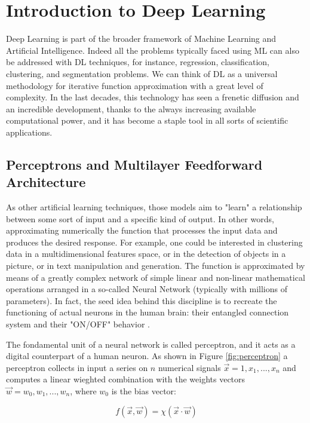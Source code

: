 \section{Introduction to Deep Learning}
Deep Learning is part of the broader framework of Machine Learning and Artificial Intelligence. Indeed all the problems typically faced using ML can also be addressed with DL techniques, for instance, regression, classification, clustering, and segmentation problems. We can think of DL as a universal methodology for iterative function approximation with a great level of complexity. In the last decades, this technology has seen a frenetic diffusion and an incredible development, thanks to the always increasing available computational power, and it has become a staple tool in all sorts of scientific applications.

\subsection{Perceptrons and Multilayer Feedforward Architecture}
As other artificial learning techniques, those models aim to "learn" a relationship between some sort of input and a specific kind of output. In other words,  approximating numerically the function that processes the input data and produces the desired response. For example, one could be interested in clustering data in a multidimensional features space, or in the detection of objects in a picture, or in text manipulation and generation. The function is approximated by means of a greatly complex network of simple linear and non-linear mathematical operations arranged in a so-called Neural Network (typically with millions of parameters). In fact, the seed idea behind this discipline is to recreate the functioning of actual neurons in the human brain: their entangled connection system and their "ON/OFF" behavior \cite{10.5555/3275328}.

The fondamental unit of a neural network is called perceptron, and it acts as a digital counterpart of a human neuron. As shown in Figure \ref{fig:perceptron} a perceptron collects in input a series on $n$ numerical signals $\vec{x} = 1, x_1, ..., x_n $ and computes a linear wieghted combination with the weights vectors $\vec{w} = w_0, w_1, ..., w_n$, where $w_0$ is the bias vector:

\begin{equation}
    f(\vec{x},\vec{w}) = \chi(\vec{x} \cdot \vec{w})
\end{equation}

